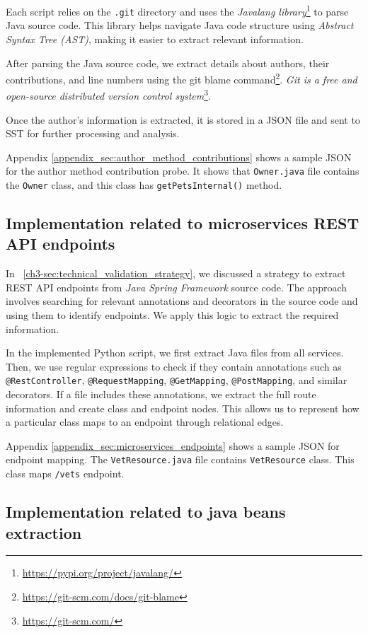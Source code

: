 Each script relies on the \texttt{.git} directory and uses the \textit{Javalang library}\footnote{\url{https://pypi.org/project/javalang/}} to parse Java source code. This library helps navigate Java code structure using \textit{Abstract Syntax Tree (AST)}, making it easier to extract relevant information.

After parsing the Java source code, we extract details about authors, their contributions, and line numbers using the git blame command\footnote{\url{https://git-scm.com/docs/git-blame}}. \textit{Git is a free and open-source distributed version control system}\footnote{\url{https://git-scm.com/}}.

Once the author's information is extracted, it is stored in a JSON file and sent to SST for further processing and analysis.

Appendix \ref{appendix_sec:author_method_contributions} shows a sample JSON for the author method contribution probe. It shows that \texttt{Owner.java} file contains the \texttt{Owner} class, and this class has \texttt{getPetsInternal()} method.

\subsection{Implementation related to microservices REST API endpoints}

In ~\autoref{ch3-sec:technical_validation_strategy}, we discussed a strategy to extract REST API endpoints from \textit{Java Spring Framework} source code. The approach involves searching for relevant annotations and decorators in the source code and using them to identify endpoints. We apply this logic to extract the required information.  

In the implemented Python script, we first extract Java files from all services. Then, we use regular expressions to check if they contain annotations such as \texttt{@RestController}, \texttt{@RequestMapping}, \texttt{@GetMapping}, \texttt{@PostMapping}, and similar decorators. If a file includes these annotations, we extract the full route information and create class and endpoint nodes. This allows us to represent how a particular class maps to an endpoint through relational edges.

Appendix \ref{appendix_sec:microservices_endpoints} shows a sample JSON for endpoint mapping. The \texttt{VetResource.java} file contains \texttt{VetResource} class. This class maps \texttt{/vets} endpoint.

\subsection{Implementation related to java beans extraction}

